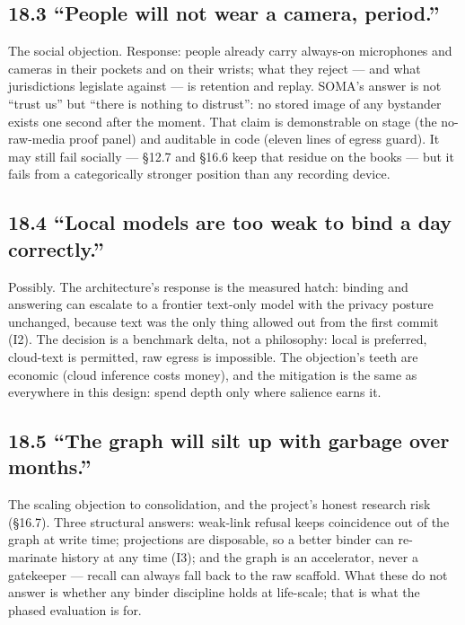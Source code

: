 \subsection{18.3 ``People will not wear a camera, period.''}\label{people-will-not-wear-a-camera-period.}

The social objection. Response: people already carry always-on microphones and cameras in their pockets and on their wrists; what they reject --- and what jurisdictions legislate against --- is retention and replay. SOMA's answer is not ``trust us'' but ``there is nothing to distrust'': no stored image of any bystander exists one second after the moment. That claim is demonstrable on stage (the no-raw-media proof panel) and auditable in code (eleven lines of egress guard). It may still fail socially --- \S{}12.7 and \S{}16.6 keep that residue on the books --- but it fails from a categorically stronger position than any recording device.

\subsection{18.4 ``Local models are too weak to bind a day correctly.''}\label{local-models-are-too-weak-to-bind-a-day-correctly.}

Possibly. The architecture's response is the measured hatch: binding and answering can escalate to a frontier text-only model with the privacy posture unchanged, because text was the only thing allowed out from the first commit (I2). The decision is a benchmark delta, not a philosophy: local is preferred, cloud-text is permitted, raw egress is impossible. The objection's teeth are economic (cloud inference costs money), and the mitigation is the same as everywhere in this design: spend depth only where salience earns it.

\subsection{18.5 ``The graph will silt up with garbage over months.''}\label{the-graph-will-silt-up-with-garbage-over-months.}

The scaling objection to consolidation, and the project's honest research risk (\S{}16.7). Three structural answers: weak-link refusal keeps coincidence out of the graph at write time; projections are disposable, so a better binder can re-marinate history at any time (I3); and the graph is an accelerator, never a gatekeeper --- recall can always fall back to the raw scaffold. What these do not answer is whether any binder discipline holds at life-scale; that is what the phased evaluation is for.

